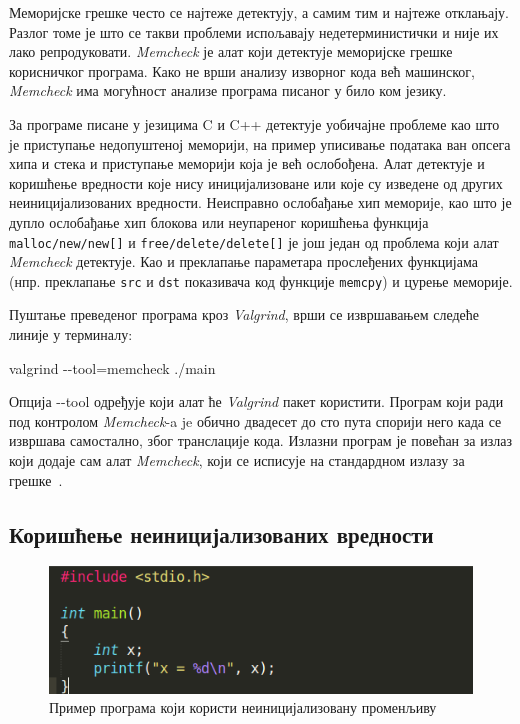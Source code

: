 \documentclass[12pt,oneside]{memoir}
\begin{document}
\indent Меморијске грешке често се најтеже детектују, а самим тим и најтеже отклањају. Разлог томе је што се такви проблеми испољавају недетерминистички и није их лако репродуковати. \textit{Memcheck} је алат који детектује меморијске грешке корисничког програма. Како не врши анализу изворног кода већ машинског, \textit{Memcheck} има могућност анализе програма писаног у било ком језику.

\indent За програме писане у језицима C и C++ детектује уобичајне проблеме као што је приступање недопуштеној меморији, на пример уписивање података ван опсега хипа и стека и приступање меморији која је већ ослобођена. Алат детектује и коришћење вредности које нису иницијализоване или које су изведене од других неиницијализованих вредности. Неисправно ослобађање хип меморије, као што је дупло ослобађање хип блокова или неупареног коришћења функција \texttt{malloc/new/new[]} и \texttt{free/delete/delete[]} је још један од проблема који алат \textit{Memcheck} детектује. Као и преклапање параметара прослеђених функцијама (нпр. преклапање \texttt{src} и \texttt{dst} показивача код функције \texttt{memcpy}) и цурење меморије.

\indent Пуштање преведеног програма кроз \textit{Valgrind}, врши се извршавањем следеће линије у терминалу:

\begin{center}
\large
 valgrind -\--tool=memcheck ./main
\end{center}

\indent Опција -\--tool одређује који алат ће \textit{Valgrind} пакет користити. Програм који ради под контролом \textit{Memcheck}-a je обично двадесет до сто пута спорији него када се извршава самостално, због транслације кода. Излазни програм је повећан за излаз који додаје сам алат \textit{Memcheck}, који се исписује на стандардном излазу за грешке~\cite{memcheckRef}.



\subsection{Коришћење неиницијализованих вредности}

\begin{figure}[h!]
\begin{center}
\includegraphics[scale=0.75]{slika1.png}
\end{center}
\caption{Пример програма који користи неиницијализовану променљиву}
\label{fig:main}
\end{figure}
\end{document}

